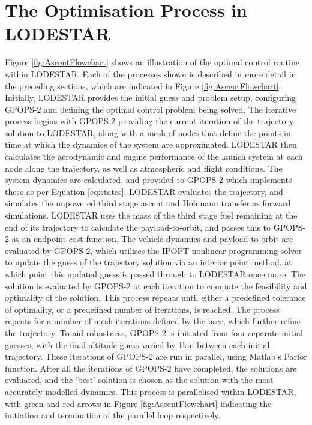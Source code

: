 \section{The Optimisation Process in LODESTAR}
Figure \ref{fig:AscentFlowchart} shows an illustration of the optimal control routine within LODESTAR. Each of the processes shown is described in more detail in the preceding sections, which are indicated in Figure \ref{fig:AscentFlowchart}. Initially, LODESTAR provides the initial guess and problem setup, configuring GPOPS-2 and defining the optimal control problem being solved. 
The iterative process begins with GPOPS-2 providing the current iteration of the trajectory solution to LODESTAR, along with a mesh of nodes that define the points in time at which the dynamics of the system are approximated.
LODESTAR then calculates the aerodynamic and engine performance of the launch system at each node along the trajectory, as well as atmospheric and flight conditions. The system dynamics are calculated, and provided to GPOPS-2 which implements these as per Equation \ref{eq:states}. LODESTAR evaluates the trajectory, and simulates the unpowered third stage ascent and Hohmann transfer as forward simulations. LODESTAR uses the mass of the third stage fuel remaining at the end of its trajectory to calculate the payload-to-orbit, and passes this to GPOPS-2 as an endpoint cost function. 
The vehicle dynamics and payload-to-orbit are evaluated by GPOPS-2, which utilises the IPOPT nonlinear programming solver\cite{Wachter2006} to update the guess of the trajectory solution via an interior point method, at which point this updated guess is passed through to LODESTAR once more. The solution is evaluated by GPOPS-2 at each iteration to compute the feasibility and optimality of the solution. This process repeats until either a predefined tolerance of optimality, or a predefined number of iterations, is reached. The process repeats for a number of mesh iterations defined by the user, which further refine the trajectory. 
To aid robustness, GPOPS-2 is initiated from four separate initial guesses, with the final altitude guess varied by 1km between each initial trajectory. These iterations of GPOPS-2 are run in parallel, using Matlab's \textsf{Parfor} function. After all the iterations of GPOPS-2 have completed, the solutions are evaluated, and the `best' solution is chosen as the solution with the most accurately modelled dynamics. This process is parallelised within LODESTAR, with green and red arrows in Figure \ref{fig:AscentFlowchart} indicating the initiation and termination of the parallel loop respectively. 




